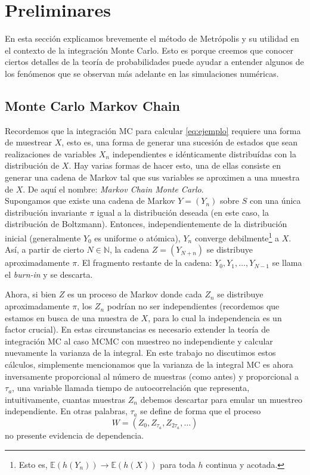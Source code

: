 \documentclass[a4paper,12pt]{article}
\newcommand{\N}{\mathbb{N}}
\newcommand{\E}{\mathbb{E}}
\begin{document}
\section{Preliminares}
\label{sec:preliminares}

En esta sección explicamos brevemente el método de Metrópolis y su utilidad en el contexto de la integración Monte Carlo. Esto es porque creemos que conocer ciertos detalles de la teoría de probabilidades puede ayudar a entender algunos de los fenómenos que se observan más adelante en las simulaciones numéricas.

\subsection{Monte Carlo Markov Chain}

Recordemos que la integración MC para calcular \eqref{eq:ejemplo} requiere una forma de muestrear $X$, esto es, una forma de generar una sucesión de estados que sean realizaciones de variables $X_n$ independientes e idénticamente distribuídas con la distribución de $X$. Hay varias formas de hacer esto, una de ellas consiste en generar una cadena de Markov tal que sus variables se aproximen a una muestra de $X$. De aquí el nombre: {\it Markov Chain Monte Carlo}.\\

Supongamos que existe una cadena de Markov $Y = (Y_n)$ sobre $S$ con una única distribución invariante $\pi$ igual a la distribución deseada (en este caso, la distribución de Boltzmann). Entonces, independientemente de la distribución inicial (generalmente $Y_0$ es uniforme o atómica), $Y_n$ converge debilmente\footnote{Esto es, $\E(h(Y_n)) \to \E(h(X))$ para toda $h$ continua y acotada.} a $X$. Así, a partir de cierto $N \in \N$, la cadena $Z = (Y_{N + n})$ se distribuye aproximadamente $\pi$. El fragmento restante de la cadena: $Y_0, Y_1, \dots, Y_{N - 1}$ se llama el {\it burn-in} y se descarta.

Ahora, si bien $Z$ es un proceso de Markov donde cada $Z_n$ se distribuye aproximadamente $\pi$, los $Z_n$ podrían no ser independientes (recordemos que estamos en busca de una muestra de $X$, para lo cual la independencia es un factor crucial). En estas circunstancias es necesario extender la teoría de integración MC al caso MCMC con muestreo no independiente y calcular nuevamente la varianza de la integral. En este trabajo no discutimos estos cálculos, simplemente mencionamos que la varianza de la integral MC es ahora inversamente proporcional al número de muestras (como antes) y proporcional a $\tau_a$, una variable llamada tiempo de autocorrelación que representa, intuitivamente, cuantas muestras $Z_n$ debemos descartar para emular un muestreo independiente. En otras palabras, $\tau_a$ se define de forma que el proceso
\begin{equation*}
    W = (Z_0, Z_{\tau_a}, Z_{2\tau_a}, \dots)
\end{equation*}
no presente evidencia de dependencia.\\
\end{document}
